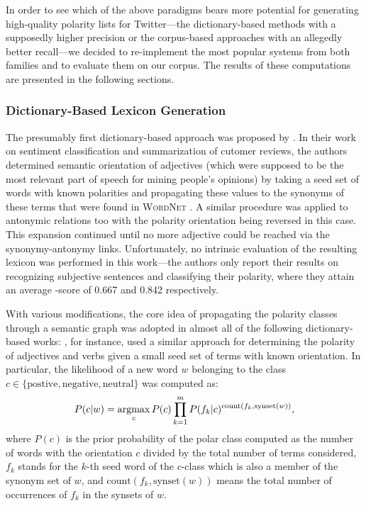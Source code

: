 In order to see which of the above paradigms bears more potential for
generating high-quality polarity lists for Twitter---the
dictionary-based methods with a supposedly higher precision or the
corpus-based approaches with an allegedly better recall---we decided
to re-implement the most popular systems from both families and to
evaluate them on our corpus.  The results of these computations are
presented in the following sections.

\subsubsection{Dictionary-Based Lexicon Generation}

The presumably first dictionary-based approach was proposed by
\citet{Hu:04}.  In their work on sentiment classification and
summarization of cutomer reviews, the authors determined semantic
orientation of adjectives (which were supposed to be the most relevant
part of speech for mining people's opinions) by taking a seed set of
words with known polarities and propagating these values to the
synonyms of these terms that were found in \textsc{WordNet}
\cite{Miller:95}.  A similar procedure was applied to antonymic
relations too with the polarity orientation being reversed in this
case.  This expansion continued until no more adjective could be
reached via the synonymy-antonymy links.  Unfortunately, no intrinsic
evaluation of the resulting lexicon was performed in this work---the
authors only report their results on recognizing subjective sentences
and classifying their polarity, where they attain an average \F-score
of 0.667 and 0.842 respectively.

With various modifications, the core idea of propagating the polarity
classes through a semantic graph was adopted in almost all of the
following dictionary-based works: \citet{Kim:04}, for instance, used a
similar approach for determining the polarity of adjectives and verbs
given a small seed set of terms with known orientation.  In
particular, the likelihood of a new word $w$ belonging to the class $c
\in \{\textrm{postive}, \textrm{negative}, \textrm{neutral}\}$ was
computed as:
\begin{equation*}
  P(c|w) = \argmax_{c}P(c)\prod_{k=1}^{m}{P(f_k|c)^{\textrm{count}(f_k,\textrm{synset}(w))}},
\end{equation*}
where $P(c)$ is the prior probability of the polar class computed as
the number of words with the orientation $c$ divided by the total
number of terms considered, $f_k$ stands for the $k$-th seed word of
the $c$-class which is also a member of the synonym set of $w$, and
$\textrm{count}(f_k,\textrm{synset}(w))$ means the total number of
occurrences of $f_k$ in the synsets of $w$.

